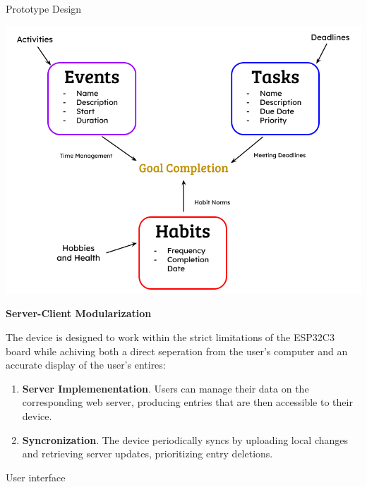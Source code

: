 \documentclass[final]{beamer}
\newlength{\colwidth}
\begin{document}
\begin{frame}[t]
\begin{columns}[t]
\begin{column}{\colwidth}
\begin{block}{Prototype Design}
    \begin{center}
      \includegraphics{entry_logic.png}
    \end{center}

    \textbf{Server-Client Modularization}

    The device is designed to work within the strict limitations of the ESP32C3 board while achiving both a direct seperation from the user's computer and an accurate display of the user's entires:

    \begin{enumerate}
      \item \textbf{Server Implemenentation}. Users can manage their data on the corresponding web server, producing entries that are then accessible to their device.
      \item \textbf{Syncronization}. The device periodically syncs by uploading local changes and retrieving server updates, prioritizing entry deletions.
    \end{enumerate}

    \end{block}

    \begin{block}{User interface}


\end{block}
\end{column}
\end{columns}
\end{frame}
\end{document}
